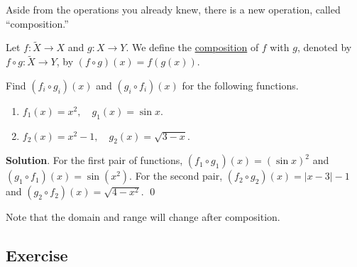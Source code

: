 \documentclass[11pt]{book}
\begin{document}
Aside from the operations you already knew, there is a new operation, called ``composition.''

\begin{definition}[Composition]
    Let $f:\tilde{X}\to X$ and $g:X\to Y$. We define the \underline{composition} of $f$ with $g$, denoted by $f\circ g:\tilde{X}\to Y$, by $(f\circ g)(x)=f(g(x))$.
\end{definition}

\begin{example}
    Find $(f_i\circ g_i)(x)$ and $(g_i\circ f_i)(x)$ for the following functions.
    \begin{enumerate}
        \item $f_1(x)=x^2, \quad g_1(x)=\sin x$.
        \item $f_2(x)=x^2-1, \quad g_2(x)=\sqrt{3-x}$.
    \end{enumerate}
\end{example}
\textbf{Solution}. For the first pair of functions, $(f_1\circ g_1)(x)=(\sin x)^2$ and $(g_1\circ f_1)(x)=\sin(x^2)$. For the second pair, $(f_2\circ g_2)(x)=|x-3|-1$ and $(g_2\circ f_2)(x)=\sqrt{4-x^2}$. \qed

Note that the domain and range will change after composition.

\subsection*{Exercise}

\setlength{\delimitershortfall}{0pt}
\end{document}
